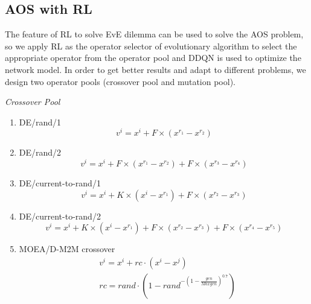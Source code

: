 \documentclass[journal]{IEEEtran}
\begin{document}
\subsection{AOS with RL}
The feature of RL to solve EvE dilemma can be used to solve the AOS problem, so we apply RL as the operator selector of evolutionary algorithm to select the appropriate operator from the operator pool and DDQN is used to optimize the network model.
In order to get better results and adapt to different problems, we design two operator pools (crossover pool and mutation pool).

\textit{Crossover Pool}
\begin{enumerate}
  \item DE/rand/1
        \begin{equation}
          v^{i}=x^{i}+F \times\left(x^{r_{1}}-x^{r_{2}}\right)
          \label{de1}
        \end{equation}
  \item DE/rand/2
        \begin{equation}
          v^{i}=x^{i}+F \times\left(x^{r_1}-x^{r_2}\right)+F \times\left(x^{r_3}-x^{r_4}\right)
          \label{de2}
        \end{equation}
  \item DE/current-to-rand/1
        \begin{equation}
          v^{i}=x^{i}+K \times\left(x^{i}-x^{r_{1}}\right)+F \times\left(x^{r_{2}}-x^{r_{3}}\right)
        \end{equation}
  \item DE/current-to-rand/2
        \begin{equation}
          v^{i}=x^{i}+K \times\left(x^{i}-x^{r_{1}}\right)+F \times\left(x^{r_{2}}-x^{r_{3}}\right)+F \times\left(x^{r_{4}}-x^{r_{5}}\right)
        \end{equation}
  \item MOEA/D-M2M crossover
        \begin{align}
           & v^{i}=x^{i}+rc \cdot\left(x^{i}-x^{j}\right)                                    \\
           & rc={rand} \cdot\left(1-{rand}^{-\left(1-\frac{gen}{Maxgen}\right)^{0.7}}\right)
          \label{m2m:cro}
        \end{align}
\end{enumerate}
\end{document}
